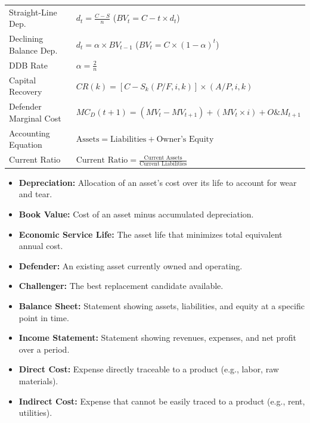 \documentclass[12pt,a4paper]{article}
\renewcommand{\arraystretch}{1.45}
\begin{document}
\begin{tcolorbox}[formulabox, title={\textbf{Key Formulas at a Glance}}]
\renewcommand{\arraystretch}{1.3}
\begin{tabularx}{\linewidth}{B{3.8cm} X}
Straight-Line Dep.      & $d_t = \displaystyle\frac{C - S}{n}$ \quad ($BV_t = C - t \times d_t$) \\[6pt]
Declining Balance Dep.  & $d_t = \alpha \times BV_{t-1}$ \quad ($BV_t = C \times (1 - \alpha)^t$) \\[4pt]
DDB Rate                & $\alpha = \displaystyle\frac{2}{n}$ \\[6pt]
Capital Recovery        & $CR(k) = [C - S_k(P/F, i, k)] \times (A/P, i, k)$ \\[4pt]
Defender Marginal Cost  & $MC_D(t+1) = (MV_t - MV_{t+1}) + (MV_t \times i) + O\&M_{t+1}$ \\[4pt]
Accounting Equation     & $\text{Assets} = \text{Liabilities} + \text{Owner's Equity}$ \\[4pt]
Current Ratio           & $\text{Current Ratio} = \displaystyle\frac{\text{Current Assets}}{\text{Current Liabilities}}$
\end{tabularx}
\end{tcolorbox}

\begin{tcolorbox}[defbox, title={\textbf{One-Line Definitions}}]
\begin{itemize}[leftmargin=*, itemsep=2pt, topsep=0pt]
  \item \textbf{Depreciation:} Allocation of an asset's cost over its life to account for wear and tear.
  \item \textbf{Book Value:} Cost of an asset minus accumulated depreciation.
  \item \textbf{Economic Service Life:} The asset life that minimizes total equivalent annual cost.
  \item \textbf{Defender:} An existing asset currently owned and operating.
  \item \textbf{Challenger:} The best replacement candidate available.
  \item \textbf{Balance Sheet:} Statement showing assets, liabilities, and equity at a specific point in time.
  \item \textbf{Income Statement:} Statement showing revenues, expenses, and net profit over a period.
  \item \textbf{Direct Cost:} Expense directly traceable to a product (e.g., labor, raw materials).
  \item \textbf{Indirect Cost:} Expense that cannot be easily traced to a product (e.g., rent, utilities).
\end{itemize}
\end{tcolorbox}
\end{document}
